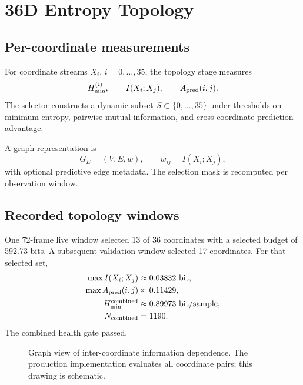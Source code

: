 \chapter{36D Entropy Topology}
\section{Per-coordinate measurements}
For coordinate streams $X_i$, $i=0,\ldots,35$, the topology stage measures
\begin{equation}
H_{\min}^{(i)},\qquad I(X_i;X_j),\qquad A_{\mathrm{pred}}(i,j).
\end{equation}
The selector constructs a dynamic subset $S\subset\{0,\ldots,35\}$ under thresholds on minimum entropy, pairwise mutual information, and cross-coordinate prediction advantage.

A graph representation is
\begin{equation}
G_E=(V,E,w),\qquad w_{ij}=I(X_i;X_j),
\end{equation}
with optional predictive edge metadata. The selection mask is recomputed per observation window.

\section{Recorded topology windows}
One 72-frame live window selected 13 of 36 coordinates with a selected budget of 592.73 bits. A subsequent validation window selected 17 coordinates. For that selected set,
\begin{align}
\max I(X_i;X_j)&\approx0.03832\ \text{bit},\\
\max A_{\mathrm{pred}}(i,j)&\approx0.11429,\\
H_{\min}^{\mathrm{combined}}&\approx0.89973\ \text{bit/sample},\\
N_{\mathrm{combined}}&=1190.
\end{align}
The combined health gate passed.

\begin{figure}[ht]
\centering
{}
\caption{Graph view of inter-coordinate information dependence. The production implementation evaluates all coordinate pairs; this drawing is schematic.}
\end{figure}

